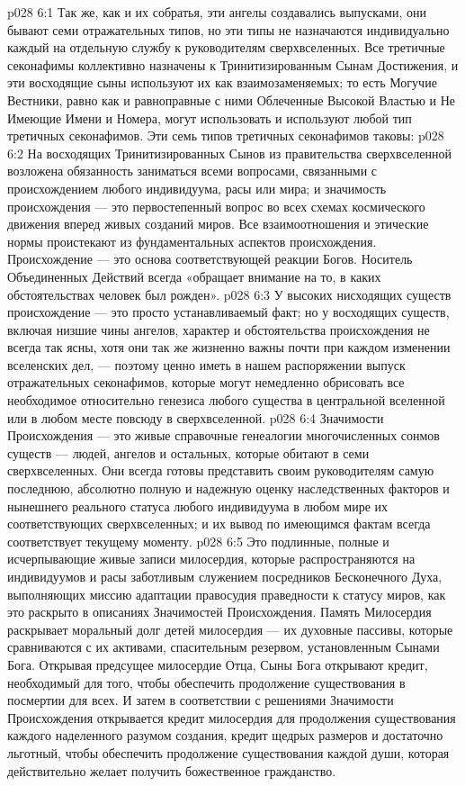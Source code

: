 \vs p028 6:1 Так же, как и их собратья, эти ангелы создавались выпусками, они бывают семи отражательных типов, но эти типы не назначаются индивидуально каждый на отдельную службу к руководителям сверхвселенных. Все третичные секонафимы коллективно назначены к Тринитизированным Сынам Достижения, и эти восходящие сыны используют их как взаимозаменяемых; то есть Могучие Вестники, равно как и равноправные с ними Облеченные Высокой Властью и Не Имеющие Имени и Номера, могут использовать и используют любой тип третичных секонафимов. Эти семь типов третичных секонафимов таковы:
\vs p028 6:2 \bibnobreakspace {} На восходящих Тринитизированных Сынов из правительства сверхвселенной возложена обязанность заниматься всеми вопросами, связанными с происхождением любого индивидуума, расы или мира; и значимость происхождения --- это первостепенный вопрос во всех схемах космического движения вперед живых созданий миров. Все взаимоотношения и этические нормы проистекают из фундаментальных аспектов происхождения. Происхождение --- это основа соответствующей реакции Богов. Носитель Объединенных Действий всегда «обращает внимание на то, в каких обстоятельствах человек был рожден».
\vs p028 6:3 У высоких нисходящих существ происхождение --- это просто устанавливаемый факт; но у восходящих существ, включая низшие чины ангелов, характер и обстоятельства происхождения не всегда так ясны, хотя они так же жизненно важны почти при каждом изменении вселенских дел, --- поэтому ценно иметь в нашем распоряжении выпуск отражательных секонафимов, которые могут немедленно обрисовать все необходимое относительно генезиса любого существа в центральной вселенной или в любом месте повсюду в сверхвселенной.
\vs p028 6:4 Значимости Происхождения --- это живые справочные генеалогии многочисленных сонмов существ --- людей, ангелов и остальных, которые обитают в семи сверхвселенных. Они всегда готовы представить своим руководителям самую последнюю, абсолютно полную и надежную оценку наследственных факторов и нынешнего реального статуса любого индивидуума в любом мире их соответствующих сверхвселенных; и их вывод по имеющимся фактам всегда соответствует текущему моменту.
\vs p028 6:5 \bibnobreakspace {} Это подлинные, полные и исчерпывающие живые записи милосердия, которые распространяются на индивидуумов и расы заботливым служением посредников Бесконечного Духа, выполняющих миссию адаптации правосудия праведности к статусу миров, как это раскрыто в описаниях Значимостей Происхождения. Память Милосердия раскрывает моральный долг детей милосердия --- их духовные пассивы, которые сравниваются с их активами, спасительным резервом, установленным Сынами Бога. Открывая предсущее милосердие Отца, Сыны Бога открывают кредит, необходимый для того, чтобы обеспечить продолжение существования в посмертии для всех. И затем в соответствии с решениями Значимости Происхождения открывается кредит милосердия для продолжения существования каждого наделенного разумом создания, кредит щедрых размеров и достаточно льготный, чтобы обеспечить продолжение существования каждой души, которая действительно желает получить божественное гражданство.
